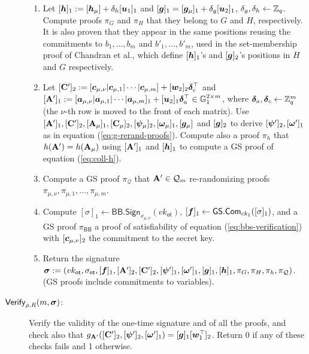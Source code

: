 \begin{description}
\begin{enumerate}
\item Let $[{\boldsymbol{h}}]_1:=[{\boldsymbol{h}}_\mu]+\delta_h[{\boldsymbol{u}}_1]_1$ and $[{\boldsymbol{g}}]_1=[{\boldsymbol{g}}_\mu]_1+\delta_g[{\boldsymbol{u}}_2]_1$, $\delta_g,\delta_h\gets\mathbb{Z}_q$. Compute proofs $\pi_G$ and $\pi_H$ that they belong to $G$ and $H$, respectively. It is also proven that they appear in the same positions reusing the commitments to $b_1,\ldots,b_{m}$ and $b'_1,\ldots,b'_{m}$, used in the set-membership proof of Chandran et al., which define $[{\boldsymbol{h}}]_1$'s and $[{\boldsymbol{g}}]_2$'s positions in $H$ and $G$ respectively.

\item Let
$
[\mathbf{{C}}']_2:=[{\boldsymbol{c}}_{\mu,\nu}|{\boldsymbol{c}}_{\mu,1}|\cdots|{\boldsymbol{c}}_{\mu,m}]+[{\boldsymbol{w}}_2]_2{\boldsymbol{\delta}}_c^\top$ and $[\mathbf{{A}}']_1:=[{\boldsymbol{a}}_{\mu,\nu} |\allowbreak {\boldsymbol{a}}_{\mu,1} | \cdots |{\boldsymbol{a}}_{\mu,m}]_1+[{\boldsymbol{u}}_2]_1{\boldsymbol{\delta}}_a^\top\in\mathbb{G}^{2\times m}_1$, where ${\boldsymbol{\delta}}_a,{\boldsymbol{\delta}}_c\gets\mathbb{Z}_q^m$ (the $\nu$-th row is moved to the front of each matrix).
Use $[\mathbf{{A}}']_1,[\mathbf{{C}}']_2,[\mathbf{{A}}_\mu]_1,[\mathbf{{C}}_\mu]_2,[{\boldsymbol{\psi}}_\mu]_2,[{\boldsymbol{\omega}}_\mu]_1,[{\boldsymbol{g}}_\mu]$ and $[{\boldsymbol{g}}]_2$ to derive $[{\boldsymbol{\psi}}']_2,[{\boldsymbol{\omega}}']_1$ as in equation (\ref{eq:g-rerand-proofs}). Compute also a proof $\pi_h$ that $h(\mathbf{{A}}')=h(\mathbf{{A}}_\mu)$ using $[\mathbf{{A}}']_1$ and $[{\boldsymbol{h}}
]_1$ to compute a GS proof of equation (\ref{eq:coll-h}).
\item Compute a GS proof $\pi_{\mathcal{Q}}$ that $\mathbf{{A}}'\in \mathcal{Q}_m$ re-randomizing proofs $\pi_{\mu,\nu},\pi_{\mu,1},\allowbreak\ldots,\pi_{\mu,m}$.

\item Compute $[\sigma]_1\gets\mathsf{BB}.\mathsf{Sign}_{x_{\mu,\nu}}(vk_\mathsf{ot})$, $[{\boldsymbol{f}}]_1\gets{\mathsf{GS}}.\mathsf{Com}_{ck_1}([\sigma]_1)$, and a GS proof $\pi_\mathsf{BB}$ a proof of satisfiability of equation (\ref{eq:bbs-verification}) with $[{\boldsymbol{c}}_{\mu,\nu}]_2$ the commitment to the secret key.

\item Return the signature ${\boldsymbol \sigma}:=(vk_\mathsf{ot},\sigma_\mathsf{ot},[{\boldsymbol{f}}]_1,[\mathbf{{A}}']_2,[\mathbf{{C}}']_2,[{\boldsymbol{\psi}}']_1,[{\boldsymbol{\omega}}']_1,[{\boldsymbol{g}}]_1,[{\boldsymbol{h}}]_1,\allowbreak\pi_G,\pi_H, \pi_h,\pi_{\mathcal{Q}})$. (GS proofs include commitments to variables).
\end{enumerate}

\item[$\mathsf{Verify}_{\rho,R}(m,{\boldsymbol \sigma})$:] Verify the validity of the one-time signature and of all the proofs, and check also that $g_{\mathbf{{A}}'}([\mathbf{{C}}']_2,[{\boldsymbol{\psi}}']_2,[{\boldsymbol{\omega}}']_1) = [{\boldsymbol{g}}]_1[{\boldsymbol{w}}_1^\top]_2$. Return 0 if any of these checks fails and 1 otherwise.
\end{description}

